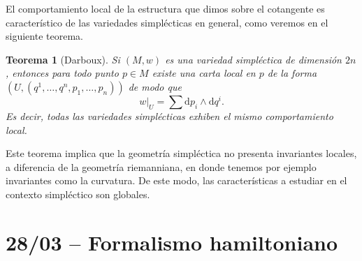 \documentclass[11pt, a4paper]{article}
\theoremstyle{plain}
\newtheorem{thm}[prop]{Teorema}
\theoremstyle{definition}
\begin{document}
El comportamiento local de la estructura que dimos sobre el cotangente es característico de las variedades simplécticas en general, como veremos en el siguiente teorema.

\begin{thm}[Darboux] Si $(M,w)$ es una variedad simpléctica de dimensión $2n$, entonces para todo punto $p\in M$ existe una carta local en $p$ de la forma $\left(U, (q^1,\dots,q^n,p_1,\dots,p_n)\right)$ de modo que
\[w|_U = \sum \mathrm{d}p_i\wedge \mathrm{d}q^i.\]
Es decir, todas las variedades simplécticas exhiben el mismo comportamiento local.
\end{thm}

Este teorema implica que la geometría simpléctica no presenta invariantes locales, a diferencia de la geometría riemanniana, en donde tenemos por ejemplo invariantes como la curvatura. De este modo, las características a estudiar en el contexto simpléctico son globales.

\section{28/03 -- Formalismo hamiltoniano}
\end{document}
